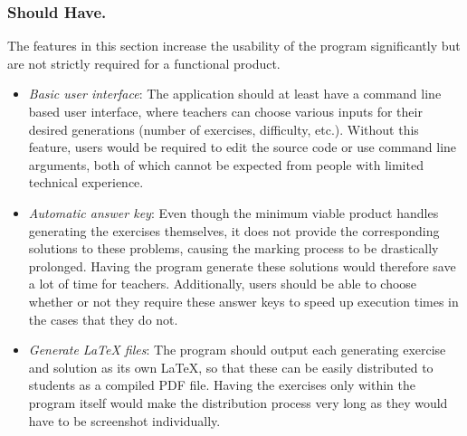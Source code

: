 \documentclass{l4proj}
\begin{document}
\subsubsection{Should Have.}
The features in this section increase the usability of the program significantly but are not strictly required for a functional product.
\begin{itemize}
	\item
	\emph{Basic user interface}: The application should at least have a command line based user interface, where teachers can choose various inputs for their desired generations (number of exercises, difficulty, etc.). Without this feature, users would be required to edit the source code or use command line arguments, both of which cannot be expected from people with limited technical experience. 
	\item
	\emph{Automatic answer key}: Even though the minimum viable product handles generating the exercises themselves,  it does not provide the corresponding solutions to these problems, causing the marking process to be drastically prolonged. Having the program generate these solutions would therefore save a lot of time for teachers. Additionally, users should be able to choose whether or not they require these answer keys to speed up execution times in the cases that they do not.
	\item
	\emph{Generate LaTeX files}: The program should output each generating exercise and solution as its own LaTeX, so that these can be easily distributed to students as a compiled PDF file. Having the exercises only within the program itself would make the distribution process very long as they would have to be screenshot individually.
\end{itemize}
\end{document}
